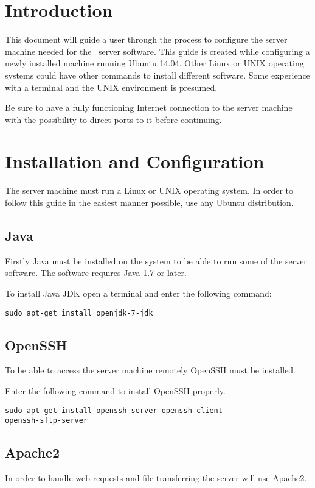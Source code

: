 \label{chap:exp_app_ubuntu}
\section{Introduction}
This document will guide a user through the process to configure the server machine needed for the \appName\ server software. This guide is created while configuring a newly installed machine running Ubuntu 14.04. Other Linux or UNIX operating systems could have other commands to install different software. Some experience with a terminal and the UNIX environment is presumed.

Be sure to have a fully functioning Internet connection to the server machine with the possibility to direct ports to it before continuing.

\section{Installation and Configuration}
The server machine must run a Linux or UNIX operating system. In order to follow this guide in the easiest manner 
possible, use any Ubuntu distribution. 

\subsection{Java}
Firstly Java must be installed on the system to be able to run some of the server software. The software requires Java 1.7 or later. 

To install Java JDK open a terminal and enter the following command:
\begin{verbatim}
sudo apt-get install openjdk-7-jdk
\end{verbatim}

\subsection{OpenSSH}
To be able to access the server machine remotely OpenSSH must be installed.

Enter the following command to install OpenSSH properly.
\begin{verbatim}
sudo apt-get install openssh-server openssh-client
openssh-sftp-server
\end{verbatim}

\subsection{Apache2}\label{sec:exp_apache2}
In order to handle web requests and file transferring the server will use Apache2. 

